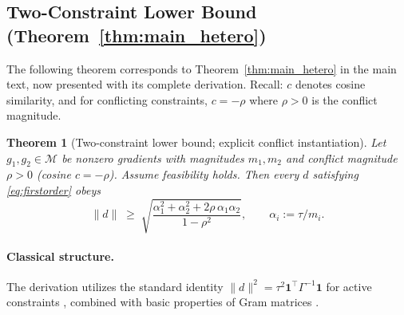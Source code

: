 \documentclass{article}
\theoremstyle{plain}
\newtheorem{theorem}{Theorem}[section]
\theoremstyle{definition}
\theoremstyle{remark}
\begin{document}
\subsection{Two-Constraint Lower Bound (Theorem~\ref{thm:main_hetero})}\label{app:two_bound}

The following theorem corresponds to Theorem~\ref{thm:main_hetero} in the main text, now presented with
its complete derivation. Recall: $c$ denotes cosine similarity, and for conflicting constraints, $c = -\rho$ where $\rho > 0$ is the conflict magnitude.

\begin{theorem}[Two-constraint lower bound; explicit conflict instantiation]
\label{thm:two_bound_cited}
Let $g_1,g_2 \in \mathcal{M}$ be nonzero gradients with magnitudes $m_1,m_2$
and conflict magnitude $\rho > 0$ (cosine $c = -\rho$).
Assume feasibility holds.
Then every $d$ satisfying \eqref{eq:firstorder} obeys
\[
\|d\|
\;\ge\;
\sqrt{\frac{\alpha_1^2 + \alpha_2^2 + 2\rho\,\alpha_1 \alpha_2}{1-\rho^2}}, \qquad \alpha_i := \tau/m_i.
\]
\end{theorem}

\paragraph{Classical structure.}
The derivation utilizes the standard identity
$\|d\|^2 = \tau^2 \mathbf{1}^\top \Gamma^{-1} \mathbf{1}$ for active constraints
\citep[cf.~pp.~231--233]{boyd2004convex},
combined with basic properties of Gram matrices
\citep{hornjohnson2013matrix}.
\end{document}
